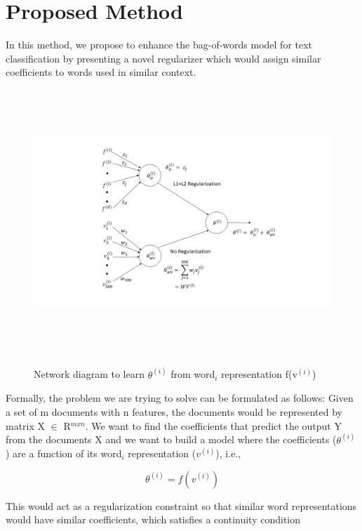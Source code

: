 \chapter{Proposed Method}

In this method, we propose to enhance the bag-of-words model for text classification by presenting a novel regularizer which would assign similar coefficients to words used in similar context.

\begin{figure}
\centering
\includegraphics[width=18cm, height=10cm]{images/Fig3.jpg}\\
\centering
\caption{Network diagram to learn $\theta^{(i)}$ from word$_{i}$ representation f(v$^{(i)}$)}
\label{fig:foo}
\end{figure}

Formally, the problem we are trying to solve can be formulated as follows: Given a set of m documents with n features, the documents would be represented by matrix X $\in$ R$^{m x n}$. We want to find the coefficients that predict the output Y from the documents X and we want to build a model where the coefficients ($\theta^{(i)}$) are a function of its word$_{i}$ representation ($v^{(i)}$), i.e.,

\begin{equation}\label{lb1}
\theta^{(i)} = f(v^{(i)})
\end{equation}

This would act as a regularization constraint so that similar word representations would have similar coefficients, which satisfies a continuity condition

